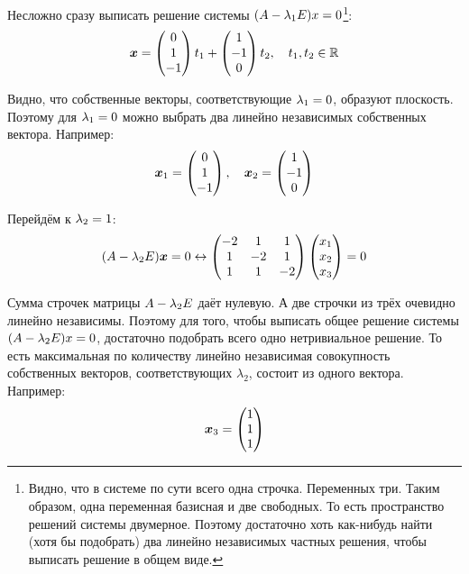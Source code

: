 \documentclass[a4paper,12pt]{article}
\begin{document}
\begin{solution}
    Несложно сразу выписать решение системы $(A \hm- \lambda_1 E) x \hm= 0$\footnote{Видно, что в системе по сути всего одна строчка. Переменных три. Таким образом, одна переменная базисная и две свободных. То есть пространство решений системы двумерное. Поэтому достаточно хоть как-нибудь найти (хотя бы подобрать) два линейно независимых частных решения, чтобы выписать решение в общем виде.}:
    \[
      \boldsymbol x = \begin{pmatrix}
        0 \\ 1 \\ -1
      \end{pmatrix} t_1 + \begin{pmatrix}
        1 \\ -1 \\ 0
      \end{pmatrix} t_2,\quad t_1, t_2 \in \operatorname{\mathbb R}
    \]
    
    Видно, что собственные векторы, соответствующие $\lambda_1 \hm= 0$, образуют плоскость.
    Поэтому для $\lambda_1 \hm= 0$ можно выбрать два линейно независимых собственных вектора.
    Например:
    \[
      \boldsymbol x_1 = \begin{pmatrix}
        0 \\ 1 \\ -1
      \end{pmatrix},
      \quad \boldsymbol x_2 = \begin{pmatrix}
        1 \\ -1 \\ 0
      \end{pmatrix}
    \]
    
    Перейдём к $\lambda_2 \hm= 1$:
    \[
      (A - \lambda_2 E) \boldsymbol x = 0
      \leftrightarrow \begin{pmatrix}
        -2 & 1 & 1\\
        1 & -2 & 1\\
        1 & 1 & -2
      \end{pmatrix} \begin{pmatrix}
        x_1 \\ x_2 \\ x_3
      \end{pmatrix} = 0
    \]
    
    Сумма строчек матрицы $A \hm- \lambda_2 E$ даёт нулевую.
    А две строчки из трёх очевидно линейно независимы.
    Поэтому для того, чтобы выписать общее решение системы $(A \hm- \lambda_2 E) x \hm= 0$, достаточно подобрать всего одно нетривиальное решение.
    То есть максимальная по количеству линейно независимая совокупность собственных векторов, соответствующих $\lambda_2$, состоит из одного вектора.
    Например:
    \[
      \boldsymbol x_3 = \begin{pmatrix}
        1 \\ 1 \\ 1
      \end{pmatrix}
    \]
    

\end{solution}
\end{document}
